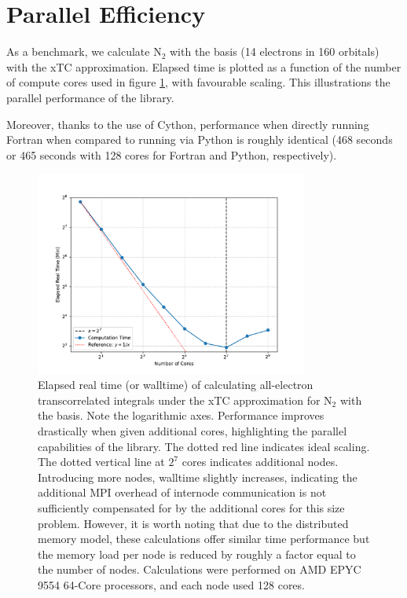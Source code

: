\section{Parallel Efficiency}

As a benchmark, we calculate N$_2$ with the \avqz basis (14 electrons in 160 orbitals) with the \gls{xTC} approximation. Elapsed time is plotted as a function of the number of compute cores used in figure \ref{fig:parallel-performance}, with favourable scaling. This illustrations the parallel performance of the \pytchint library.

Moreover, thanks to the use of Cython, performance when directly running Fortran when compared to running via Python is roughly identical (468 seconds or 465 seconds with 128 cores for Fortran and Python, respectively).

\begin{figure}[htbp]
    \centering
    \includegraphics[width=0.8\textwidth]{figures/pytchint/ncore_walltime}
    \caption{Elapsed real time (or walltime) of calculating all-electron transcorrelated integrals under the \gls{xTC} approximation for N$_2$ with the \avqz basis. Note the logarithmic axes. Performance improves drastically when given additional cores, highlighting the parallel capabilities of the \pytchint library. The dotted red line indicates ideal scaling. The dotted vertical line at $2^7$ cores indicates additional nodes. Introducing more nodes, walltime slightly increases, indicating the additional MPI overhead of internode communication is not sufficiently compensated for by the additional cores for this size problem. However, it is worth noting that due to the distributed memory model, these calculations offer similar time performance but the memory load per node is reduced by roughly a factor equal to the number of nodes. Calculations were performed on AMD EPYC 9554 64-Core processors, and each node used 128 cores.}
    \label{fig:parallel-performance}
\end{figure}

